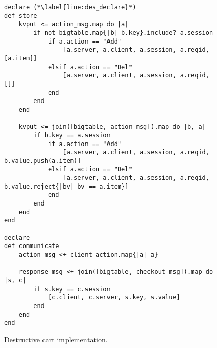 \begin{comment}
\jmh{Alternative to lines 5--9 is to insert the following rule.  It ``preserves'' the action items that have adds but no deletes ... i.e. the other branch of the left-outer-join.  I think this is easier to explain.}  \jmh{regardless of what you decide, be sure to explain all lines of the program!}
\begin{scriptsize}
\begin{verbatim}
	status <= join(action_cnt, checkout).map do |a, c|
	  if a.action == "Add" and not
	        action_cnt.map{|d| d.id if d.action == "Del" and a.id}.include? a.id
	     [a.session, a.item, a.cnt]
	  end
	end
\end{verbatim}	
\end{scriptsize}
\end{comment}

\begin{figure}[t]
\begin{scriptsize}
\begin{lstlisting}
declare (*\label{line:des_declare}*)
def store
	kvput <= action_msg.map do |a|
		if not bigtable.map{|b| b.key}.include? a.session
			if a.action == "Add"
				[a.server, a.client, a.session, a.reqid, [a.item]]
			elsif a.action == "Del"
				[a.server, a.client, a.session, a.reqid, []]
			end
		end
	end  

	kvput <= join([bigtable, action_msg]).map do |b, a|
		if b.key == a.session
			if a.action == "Add"
				[a.server, a.client, a.session, a.reqid, b.value.push(a.item)]
			elsif a.action == "Del"
				[a.server, a.client, a.session, a.reqid, b.value.reject{|bv| bv == a.item}]
			end
		end
	end
end

declare
def communicate
	action_msg <+ client_action.map{|a| a}

	response_msg <+ join([bigtable, checkout_msg]).map do |s, c|
		if s.key == c.session
			[c.client, c.server, s.key, s.value]
		end
	end
end
\end{lstlisting}
\vspace{-10pt}
\caption{Destructive cart implementation.}
\label{fig:pdg-destructive}
\vspace{-2pt}
\end{scriptsize}
\end{figure}
